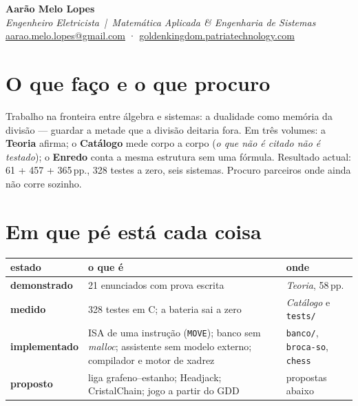 \documentclass[11pt,a4paper]{article}
\begin{document}

\begin{center}
{\LARGE\bfseries Aarão Melo Lopes}\\[2pt]
{\color{cinza}\emph{Engenheiro Eletricista \,|\, Matemática Aplicada \& Engenharia de Sistemas}}\\[2pt]
{\small
\href{mailto:aarao.melo.lopes@gmail.com}{aarao.melo.lopes@gmail.com}
\quad·\quad
\href{https://goldenkingdom.patriatechnology.com}{goldenkingdom.patriatechnology.com}}
\end{center}

\vspace{-2pt}
\section*{O que faço e o que procuro}

Trabalho na fronteira entre álgebra e sistemas: a dualidade como memória da divisão ---
guardar a metade que a divisão deitaria fora. Em três volumes: a \textbf{Teoria} afirma;
o \textbf{Catálogo} mede corpo a corpo (\emph{o que não é citado não é testado}); o
\textbf{Enredo} conta a mesma estrutura sem uma fórmula. Resultado actual: 61 + 457 + 365\,pp.,
328 testes a zero, seis sistemas. Procuro parceiros onde ainda não corre sozinho.

\section*{Em que pé está cada coisa}

\begin{center}\footnotesize
\begin{tabular}{@{}p{2.3cm}p{8.0cm}p{4.2cm}@{}}
\toprule
\textbf{estado} & \textbf{o que é} & \textbf{onde} \\
\midrule
\textbf{demonstrado} &
21 enunciados com prova escrita &
\emph{Teoria}, 58\,pp. \\[1pt]
\textbf{medido} &
328 testes em C; a bateria sai a zero &
\emph{Catálogo} e \texttt{tests/} \\[1pt]
\textbf{implementado} &
ISA de uma instrução (\texttt{MOVE}); banco sem \emph{malloc};
assistente sem modelo externo; compilador e motor de xadrez &
\texttt{banco/}, \texttt{broca-so}, \texttt{chess} \\[1pt]
\textbf{proposto} &
liga grafeno--estanho; Headjack; CristalChain; jogo a partir do GDD &
propostas abaixo \\
\bottomrule
\end{tabular}
\end{center}
\end{document}
